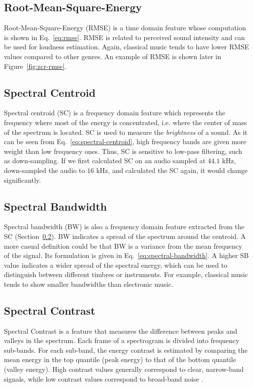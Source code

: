 \subsection{Root-Mean-Square-Energy}
\label{sec:root-mean-square-energy}
Root-Mean-Square-Energy (RMSE) is a time domain feature whose computation is shown in Eq.~\ref{eq:rmse}.
\RMSEequation
RMSE is related to perceived sound intensity and can be used for loudness estimation. Again, classical music tends to have lower RMSE values compared to other genres. An example of RMSE is shown later in Figure~\ref{fig:zcr-rmse}.

\subsection{Spectral Centroid}
\label{sec:spectral-centroid}
Spectral centroid (SC) is a frequency domain feature which represents the frequency where most of the energy is concentrated, i.e. where the center of mass of the spectrum is located. SC is used to measure the \textit{brightness} of a sound. As it can be seen from Eq.~\ref{eq:spectral-centroid}, high frequency bands are given more weight than low frequency ones. 
\SCequation
Thus, SC is sensitive to low-pass filtering, such as down-sampling. If we first calculated SC on an audio sampled at $44.1$ kHz, down-sampled the audio to $16$ kHz, and calculated the SC again, it would change significantly. 

\subsection{Spectral Bandwidth}
\label{sec:spectral-bandwidth}
Spectral bandwidth (BW) is also a frequency domain feature extracted from the SC (Section~\ref{sec:spectral-centroid}). BW indicates a spread of the spectrum around the centroid. A more casual definition could be that BW is a variance from the mean frequency of the signal. Its formulation is given in Eq.~\ref{eq:spectral-bandwidth}.
\BWequation
A higher SB value indicates a wider spread of the spectral energy, which can be used to distinguish between different timbres or instruments. For example, classical music tends to show smaller bandwidths than electronic music.

\subsection{Spectral Contrast}
\label{sec:spectral-contrast}
Spectral Contrast is a feature that measures the difference between peaks and valleys in the spectrum. Each frame of a spectrogram is divided into frequency sub-bands. For each sub-band, the energy contrast is estimated by comparing the mean energy in the top quantile (peak energy) to that of the bottom quantile (valley energy). High contrast values generally correspond to clear, narrow-band signals, while low contrast values correspond to broad-band noise \cite{jiang2002music}.

